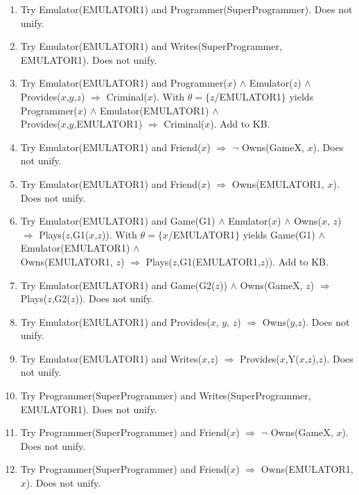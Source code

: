 \documentclass[10pt]{article}
\begin{document}
\begin{enumerate}
\begin{enumerate}
    \begin{enumerate}
    \item Try Emulator(EMULATOR1) and Programmer(SuperProgrammer).  Does
          not unify.
    \item Try Emulator(EMULATOR1) and Writes(SuperProgrammer, EMULATOR1).  Does
          not unify.
    \item Try Emulator(EMULATOR1) and 
        Programmer($x$) $\land$ Emulator($z$) $\land$ \\
            Provides($x$,$y$,$z$) $\Rightarrow$ Criminal($x$). With 
        $\theta = \{z$/EMULATOR1$\}$
        yields \\
        Programmer($x$) $\land$ Emulator(EMULATOR1) $\land$ \\
            Provides($x$,$y$,EMULATOR1) $\Rightarrow$ Criminal($x$). Add to KB.
    \item Try Emulator(EMULATOR1) and 
          Friend($x$) $\Rightarrow$ $\neg$ Owns(GameX, $x$).  Does not unify.
    \item Try Emulator(EMULATOR1) and 
          Friend($x$) $\Rightarrow$ Owns(EMULATOR1, $x$). Does not unify.
    \item Try Emulator(EMULATOR1) and 
          Game(G1) $\land$ Emulator($x$) $\land$ 
            Owns($x$, $z$) $\Rightarrow$ Plays($z$,G1($x$,$z$)). With
          $\theta = \{x$/EMULATOR1$\}$ yields
          Game(G1) $\land$ Emulator(EMULATOR1) $\land$ \\
            Owns(EMULATOR1, $z$) $\Rightarrow$ Plays($z$,G1(EMULATOR1,$z$)).
          Add to KB.
    \item Try Emulator(EMULATOR1) and Game(G2($z$)) $\land$ Owns(GameX, $z$) 
            $\Rightarrow$ Plays($z$,G2($z$)). Does not unify.
    \item Try Emulator(EMULATOR1) and 
            Provides($x$, $y$, $z$) $\Rightarrow$ Owns($y$,$z$). Does not unify.
    \item Try Emulator(EMULATOR1) and 
          Writes($x$,$z$) $\Rightarrow$ Provides($x$,Y($x$,$z$),$z$).  
          Does not unify.
    \item Try Programmer(SuperProgrammer) and 
          Writes(SuperProgrammer, EMULATOR1).  Does not unify.
    \item Try Programmer(SuperProgrammer) and 
          Friend($x$) $\Rightarrow$ $\neg$ Owns(GameX, $x$).  Does not unify.
    \item Try Programmer(SuperProgrammer) and 
          Friend($x$) $\Rightarrow$ Owns(EMULATOR1, $x$). Does not unify.

\end{enumerate}
\end{enumerate}
\end{enumerate}
\end{document}
